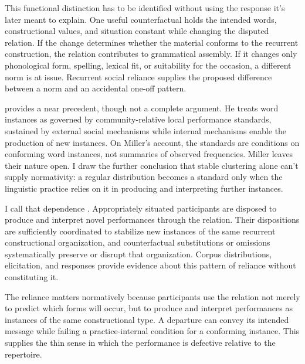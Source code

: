 \documentclass[12pt,letterpaper]{article}
\begin{document}
This functional distinction has to be identified without using the response it's
later meant to explain. One useful counterfactual holds the intended words,
constructional values, and situation constant while changing the disputed
relation. If the change determines whether the material conforms to the recurrent
construction, the relation contributes to grammatical assembly. If it changes
only phonological form, spelling, lexical fit, or suitability for the occasion,
a different norm is at issue. Recurrent social reliance supplies the proposed
difference between a norm and an accidental one-off pattern.

\textcite[26--27]{miller2021words} provides a near precedent, though not a complete
argument. He treats word instances as governed by community-relative local
performance standards, sustained by external social mechanisms while internal
mechanisms enable the production of new instances. On Miller's account, the
standards are conditions on conforming word instances, not summaries of observed
frequencies.
Miller leaves their nature open. I draw the further conclusion that stable
clustering alone can't supply normativity: a regular distribution becomes a
standard only when the linguistic practice relies on it in producing and
interpreting further instances.

I call that dependence . Appropriately situated
participants are disposed to produce and interpret novel performances through the
relation. Their dispositions are sufficiently coordinated to stabilize new
instances of the same recurrent constructional organization, and counterfactual
substitutions or omissions systematically preserve or disrupt that organization.
Corpus distributions, elicitation, and responses provide evidence about this
pattern of reliance without constituting it.

The reliance matters normatively because participants use the relation not merely
to predict which forms will occur, but to produce and interpret performances as
instances of the same constructional type. A departure can convey its
intended message while failing a practice-internal condition for a conforming
instance. This supplies the thin sense in which the performance is defective
relative to the repertoire.
\end{document}

